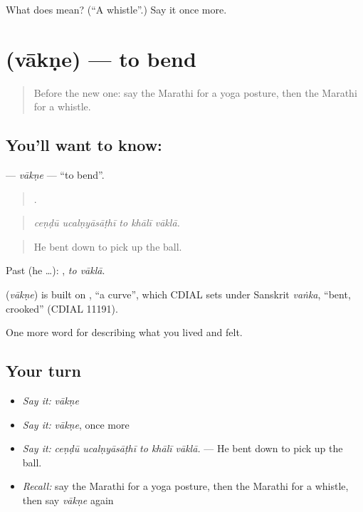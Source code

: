 \begin{tcolorbox}[breakable,colback=teal!4,colframe=teal!35!black,title={Before you move on}]
What does  mean? (\textquotedblleft{}A whistle\textquotedblright{}.) Say it once more.
\end{tcolorbox}
\section[\texorpdfstring{\mr{वाकणे} (vākṇe)}{वाकणे (vākṇe)}]{ (vākṇe) — to bend}

\label{lesson:MR-C533-vakne}



\begin{quote}
Before the new one: say the Marathi for a yoga posture, then the Marathi for a whistle.
\end{quote}

\subsection*{You'll want to know: }
\textbf{} — \emph{vākṇe} — \textquotedblleft{}to bend\textquotedblright{}.

\begin{quote}
    .
\end{quote}

\begin{quote}
\emph{ceṇḍū ucalṇyāsāṭhī to khālī vāklā.}
\end{quote}

\begin{quote}
He bent down to pick up the ball.
\end{quote}

Past (he …):  , \emph{to vāklā}.

\begin{cousinweb}
\textbf{} (\emph{vākṇe}) is built on , \textquotedblleft{}a curve\textquotedblright{}, which CDIAL sets under Sanskrit \emph{vaṅka}, \textquotedblleft{}bent, crooked\textquotedblright{} (CDIAL 11191).
\end{cousinweb}

\begin{grammarlens}[title={What you've built}]
One more word for describing what you lived and felt.
\end{grammarlens}

\subsection*{Your turn}
\begin{itemize}
\raggedright
  \item \emph{Say it:} \emph{vākṇe}
  \item \emph{Say it:} \emph{vākṇe}, once more
  \item \emph{Say it:} \emph{ceṇḍū ucalṇyāsāṭhī to khālī vāklā.} — He bent down to pick up the ball.
  \item \emph{Recall:} say the Marathi for a yoga posture, then the Marathi for a whistle, then say \emph{vākṇe} again
\end{itemize}

